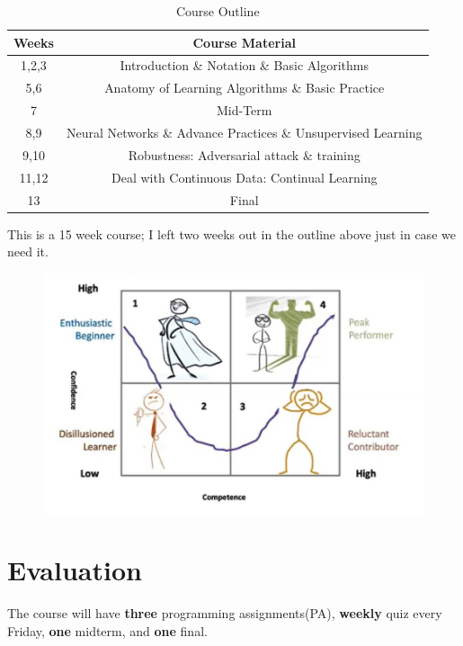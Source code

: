 \documentclass{article}
\begin{document}
\begin{table}[htbp]
    \centering
    \begin{tabular}{|c|c|}
        \hline
        \textbf{Weeks} & \textbf{Course Material}                                      \\
        \hline
        1,2,3          & Introduction \& Notation \& Basic Algorithms                  \\
        \hline
        5,6            & Anatomy of Learning Algorithms \& Basic Practice              \\
        \hline
        7              & Mid-Term                                                      \\
        \hline
        8,9            & Neural Networks \& Advance Practices \& Unsupervised Learning \\
        \hline
        9,10           & Robustness: Adversarial attack \& training                    \\
        \hline
        11,12          & Deal with Continuous Data: Continual Learning                 \\
        \hline
        13             & Final                                                         \\
        \hline
    \end{tabular}
    \caption{Course Outline}
\end{table}
This is a 15 week course; I left two weeks out in the outline above just in case we need it.
\begin{figure}[H]
    \centering
    \includegraphics[width=0.6\linewidth]{lr_curve.png}
\end{figure}
\section{Evaluation}
The course will have \textbf{three} programming assignments(PA), \textbf{weekly} quiz every Friday, \textbf{one} midterm, and \textbf{one} final.
\end{document}
